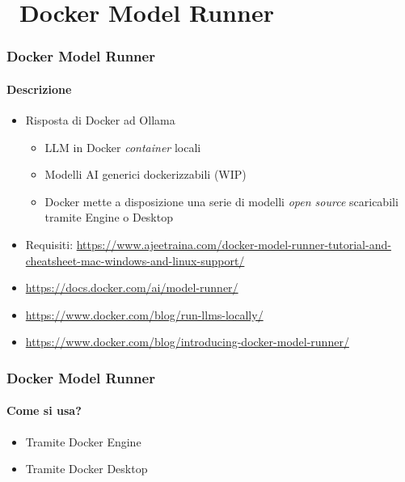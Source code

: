 \section{\faWrench\ Docker Model Runner} %
\label{sec:spring-ai-docker-model-runner}
%
\begin{frame}[t,fragile] \frametitle{Docker Model Runner}
    \framesubtitle{Descrizione}
    \begin{itemize}[leftmargin=10pt,align=right]
        \item[\alert{\faArrowCircleRight}] Risposta di Docker ad Ollama
        \begin{itemize}[leftmargin=10pt,align=right]
            \item[\alert{\faArrowCircleRight}] LLM in Docker \textit{container} locali
            \item[\alert{\faArrowCircleRight}] Modelli AI generici dockerizzabili (WIP)
            \item[\alert{\faArrowCircleRight}] Docker mette a disposizione una serie di modelli \textit{open source} scaricabili tramite Engine o Desktop
        \end{itemize}

        \item[\alert{\faArrowCircleRight}] Requisiti: {\footnotesize \url{https://www.ajeetraina.com/docker-model-runner-tutorial-and-cheatsheet-mac-windows-and-linux-support/}}

    \item[\alert{\faExternalLink}] {\footnotesize \url{https://docs.docker.com/ai/model-runner/}}
    \item[\alert{\faExternalLink}] {\footnotesize \url{https://www.docker.com/blog/run-llms-locally/}}
    \item[\alert{\faExternalLink}] {\footnotesize \url{https://www.docker.com/blog/introducing-docker-model-runner/}}
    \end{itemize}
\end{frame}
%
\begin{frame}[t,fragile] \frametitle{Docker Model Runner}
    \framesubtitle{Come si usa?}
    \begin{itemize}[leftmargin=10pt,align=right]
        \item[\alert{\faArrowCircleRight}] Tramite Docker Engine
        \item[\alert{\faArrowCircleRight}] Tramite Docker Desktop
    \end{itemize}
\end{frame}
